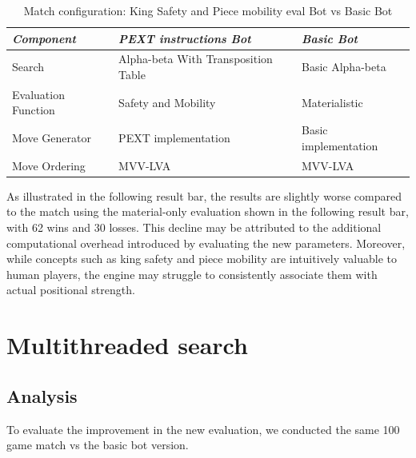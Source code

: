\begin{table}
    \centering
    \begin{tabular}{|p{4cm}|p{4cm}|p{4cm}|}
    \hline
    \textit{Component}         & \textit{PEXT instructions Bot}  & \textit{Basic Bot}     \\ \hline
    Search                     & Alpha-beta With Transposition Table          & Basic Alpha-beta           \\ \hline
    Evaluation Function        & Safety and Mobility                      & Materialistic      \\ \hline
    Move Generator             & PEXT implementation              & Basic implementation   \\ \hline
    Move Ordering              & MVV-LVA                           & MVV-LVA                \\ \hline
    \end{tabular}
    \caption{Match configuration: King Safety and Piece mobility eval Bot vs Basic Bot}\label{tab:safety_mobility_vs_basic}
\end{table}

\noindent As illustrated in the following result bar, the results are slightly worse compared to the match using the material-only evaluation shown in the following result bar, with 62 wins and 30 losses. This decline may be attributed to the additional computational overhead introduced by evaluating the new parameters. Moreover, while concepts such as king safety and piece mobility are intuitively valuable to human players, the engine may struggle to consistently associate them with actual positional strength.

\begin{center}
\medskip
\end{center}

\section{Multithreaded search}

\subsection*{Analysis}

To evaluate the improvement in the new evaluation, we conducted the same 100 game match vs the basic bot version. 

\begin{center}
\medskip
\end{center}

